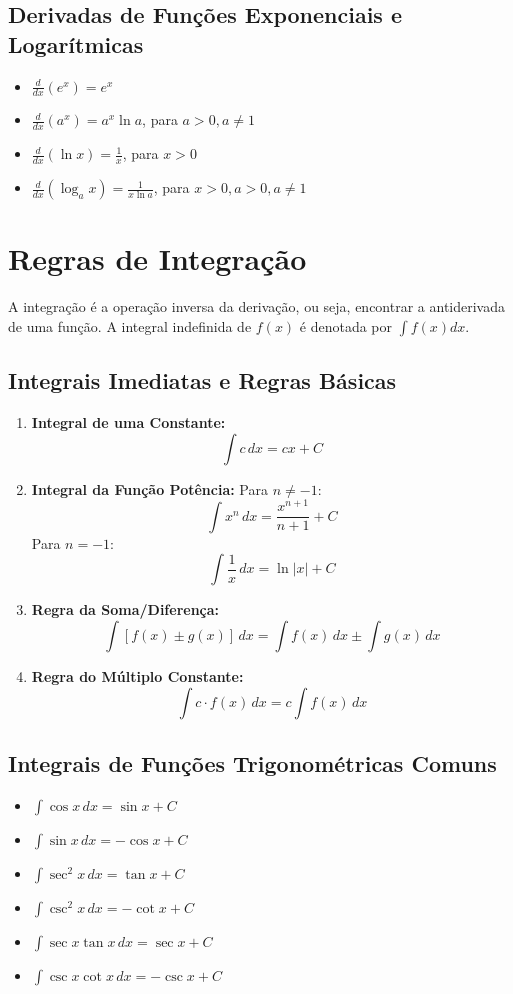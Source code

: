 \documentclass{article}
\begin{document}
\subsection{Derivadas de Funções Exponenciais e Logarítmicas}
\begin{itemize}
    \item $ \frac{d}{dx}(e^x) = e^x $
    \item $ \frac{d}{dx}(a^x) = a^x \ln a $, para $a > 0, a \neq 1$
    \item $ \frac{d}{dx}(\ln x) = \frac{1}{x} $, para $x > 0$
    \item $ \frac{d}{dx}(\log_a x) = \frac{1}{x \ln a} $, para $x > 0, a > 0, a \neq 1$
\end{itemize}

\section{Regras de Integração}
A integração é a operação inversa da derivação, ou seja, encontrar a antiderivada de uma função. A integral indefinida de $f(x)$ é denotada por $\int f(x) dx$.

\subsection{Integrais Imediatas e Regras Básicas}
\begin{enumerate}
    \item \textbf{Integral de uma Constante:}
    $$ \int c \, dx = cx + C $$

    \item \textbf{Integral da Função Potência:}
    Para $n \neq -1$:
    $$ \int x^n \, dx = \frac{x^{n+1}}{n+1} + C $$
    Para $n = -1$:
    $$ \int \frac{1}{x} \, dx = \ln|x| + C $$

    \item \textbf{Regra da Soma/Diferença:}
    $$ \int [f(x) \pm g(x)] \, dx = \int f(x) \, dx \pm \int g(x) \, dx $$

    \item \textbf{Regra do Múltiplo Constante:}
    $$ \int c \cdot f(x) \, dx = c \int f(x) \, dx $$
\end{enumerate}

\subsection{Integrais de Funções Trigonométricas Comuns}
\begin{itemize}
    \item $ \int \cos x \, dx = \sin x + C $
    \item $ \int \sin x \, dx = -\cos x + C $
    \item $ \int \sec^2 x \, dx = \tan x + C $
    \item $ \int \csc^2 x \, dx = -\cot x + C $
    \item $ \int \sec x \tan x \, dx = \sec x + C $
    \item $ \int \csc x \cot x \, dx = -\csc x + C $
\end{itemize}
\end{document}
